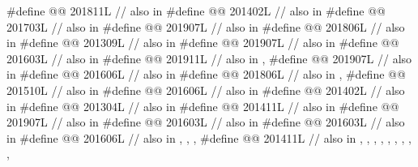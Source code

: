 \begin{codeblock}
#define @@             201811L // also in 
#define @@                          201402L // also in 
#define @@                      201703L // also in 
#define @@              201907L // also in 
#define @@            201806L // also in 
#define @@                   201309L // also in 
#define @@       201907L // also in 
#define @@                      201603L // also in 
#define @@                           201911L // also in , 
#define @@                             201907L // also in 
#define @@                           201606L // also in 
#define @@           201806L // also in , 
#define @@                    201510L // also in 
#define @@                   201606L // also in 
#define @@             201402L // also in 
#define @@                       201304L // also in 
#define @@                   201411L // also in 
#define @@                    201907L // also in 
#define @@            201603L // also in 
#define @@                   201603L // also in 
#define @@                      201606L
  // also in , , , 
#define @@        201411L
  // also in , , , , , , , , ,

\end{codeblock}
